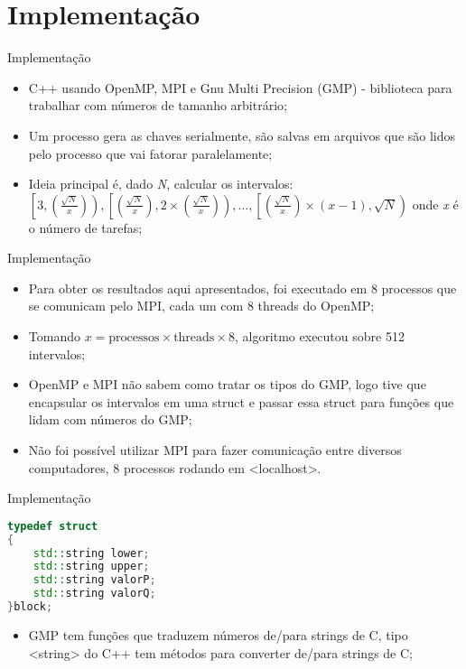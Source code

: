 \documentclass[xcolor=table]{beamer}
\def\texttt#1{<#1>}%
\begin{document}
    \section[]{Implementação}
    \begin{frame}{Implementação}
        \begin{itemize}
            \item C++ usando OpenMP, MPI e Gnu Multi Precision (GMP) - biblioteca para trabalhar com números de tamanho arbitrário;
            \item Um processo gera as chaves serialmente, são salvas em arquivos que são lidos pelo processo que vai fatorar paralelamente;
            \item Ideia principal é, dado \textit{N}, calcular os intervalos:
            \(\left[3,\left(\frac{\sqrt{N}}{x}\right)\right), \left[\left(\frac{\sqrt{N}}{x}\right), 2\times\left(\frac{\sqrt{N}}{x}\right)\right), \dots,
            \left[\left(\frac{\sqrt{N}}{x}\right)\times (x-1), \sqrt{N}\right)\) onde \textit{x} é o número de tarefas;
        \end{itemize}
    \end{frame}
    
    \begin{frame}{Implementação}
        \begin{itemize}
            \item Para obter os resultados aqui apresentados, foi executado em 8 processos que se comunicam pelo MPI, cada um com 8 threads do OpenMP;
            \item Tomando \(x = \text{processos} \times \text{threads} \times 8\), algoritmo executou sobre 512 intervalos;
            \item OpenMP e MPI não sabem como tratar os tipos do GMP, logo tive que encapsular os intervalos em uma struct e passar
                    essa struct para funções que lidam com números do GMP;
            \item Não foi possível utilizar MPI para fazer comunicação entre diversos computadores, 8 processos rodando em \texttt{localhost}.
        \end{itemize}
    \end{frame}

    \begin{frame}[fragile]{Implementação}
        \begin{lstlisting}[language=C++]
typedef struct
{
    std::string lower;
    std::string upper;
    std::string valorP;
    std::string valorQ;
}block;
        \end{lstlisting}
        \begin{itemize}
            \item GMP tem funções que traduzem números de/para strings de C, tipo \texttt{string} do C++ tem métodos para converter
                    de/para strings de C;
        \end{itemize}
    \end{frame}
\end{document}
